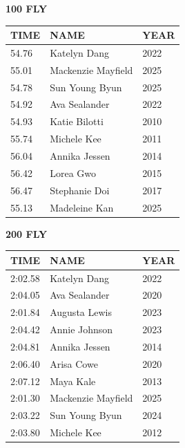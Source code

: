 \begin{table}[H]
\centering
\begin{minipage}[t]{0.48\textwidth}
\centering
\textbf{100 FLY}\\[0.1cm]
\begin{tabular}{@{}p{1.8cm}p{2.8cm}p{1.2cm}@{}}
\hline
    \textbf{TIME} & \textbf{NAME} & \textbf{YEAR} \\
\hline
    54.76 & Katelyn Dang & 2022 \\
    55.01 & Mackenzie Mayfield & 2025 \\
    54.78 & Sun Young Byun & 2025 \\
    54.92 & Ava Sealander & 2022 \\
    54.93 & Katie Bilotti & 2010 \\
    55.74 & Michele Kee & 2011 \\
    56.04 & Annika Jessen & 2014 \\
    56.42 & Lorea Gwo & 2015 \\
    56.47 & Stephanie Doi & 2017 \\
    55.13 & Madeleine Kan & 2025 \\
\hline
\end{tabular}
\end{minipage}\hfill
\begin{minipage}[t]{0.48\textwidth}
\centering
\textbf{200 FLY}\\[0.1cm]
\begin{tabular}{@{}p{1.8cm}p{2.8cm}p{1.2cm}@{}}
\hline
    \textbf{TIME} & \textbf{NAME} & \textbf{YEAR} \\
\hline
    2:02.58 & Katelyn Dang & 2022 \\
    2:04.05 & Ava Sealander & 2020 \\
    2:01.84 & Augusta Lewis & 2023 \\
    2:04.42 & Annie Johnson & 2023 \\
    2:04.81 & Annika Jessen & 2014 \\
    2:06.40 & Arisa Cowe & 2020 \\
    2:07.12 & Maya Kale & 2013 \\
    2:01.30 & Mackenzie Mayfield & 2025 \\
    2:03.22 & Sun Young Byun & 2024 \\
    2:03.80 & Michele Kee & 2012 \\
\hline
\end{tabular}
\end{minipage}
\end{table}

